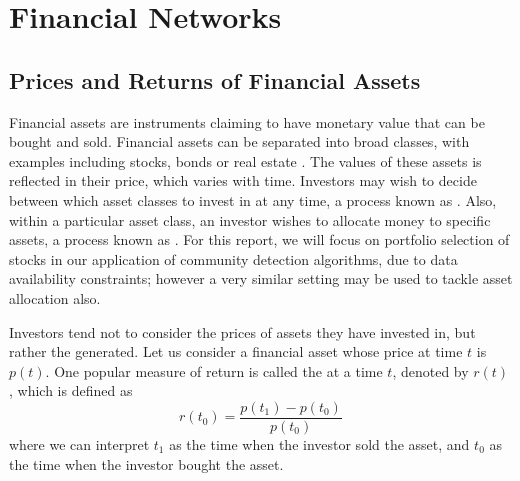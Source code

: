 
\section{Financial Networks}
\label{sec:financialNetworksBackground}


\subsection{Prices and Returns of Financial Assets}
\label{subsec:financialAssetsBackground}

Financial assets are instruments claiming to have monetary value that can be bought and sold. Financial assets can be separated into broad classes, with examples including stocks, bonds or real estate \cite{Kuh12d,BKM13}.
The values of these assets is reflected in their price, which varies with time. Investors may wish to decide between which asset classes to invest in at any time, a process known as  \cite{BKM13}.
Also, within a particular asset class, an investor wishes to allocate money to specific assets, a process known as  \cite{BKM13}.
For this report, we will focus on portfolio selection of stocks in our application of community detection algorithms, due to data availability constraints; however a very similar setting may be used to tackle asset allocation also.

Investors tend not to consider the prices of assets they have invested in, but rather the  generated.
Let us consider a financial asset whose price at time $t$ is $p(t)$.
One popular measure of return is called the  \cite{Kuh12e,BKM13} at a time $t$, denoted by $r(t)$, which is defined as
\begin{equation}
	\label{eq:rateOfReturn}
	r(t_{0}) = \frac{p(t_{1}) - p(t_{0})}{p(t_{0})}
\end{equation}
where we can interpret $t_{1}$ as the time when the investor sold the asset, and $t_{0}$ as the time when the investor bought the asset.

